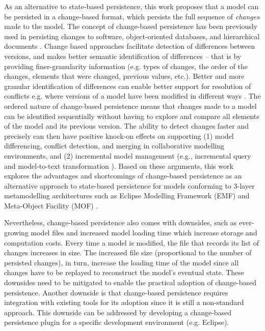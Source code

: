 As an alternative to state-based persistence, this work proposes that a model can be persisted in a change-based format, 
which persists the full sequence of \emph{changes} made to the model. 
The concept of change-based persistence has been previously used in persisting changes to software, 
object-oriented databases, and hierarchical documents 
\cite{DBLP:journals/entcs/RobbesL07,DBLP:conf/sde/LippeO92,DBLP:conf/caise/IgnatN05}. Change based approaches facilitate detection of differences between versions, and makes better semantic identification of differences -- that is by providing finer-granularity information (e.g. types of changes, the order of the changes, elements that were changed, previous values, etc.).  Better and more granular identification of differences can enable better support for resolution of conflicts e.g. where versions of a model have been modified in different ways \cite{mens2002state}. 
The ordered nature of change-based persistence means that changes made to a model can be identified sequentially without having to explore and compare all elements of the model and its previous version. The ability to detect changes faster and precisely can then have positive knock-on effects on supporting (1) model differencing, conflict detection, and merging in collaborative modelling environments, and (2) incremental model management (e.g., incremental query \cite{DBLP:conf/ecmdafa/RathHV12} and model-to-text transformation \cite{DBLP:conf/ecmdafa/OgunyomiRK15}). Based on these arguments, 
this work explores the advantages and shortcomings of change-based persistence as an alternative approach to state-based persistence for models conforming to 3-layer metamodelling architectures such as Eclipse Modelling Framework (EMF) \cite{eclipse2019emf} and Meta-Object Facility (MOF) \cite{omg2018mof}.

Nevertheless, change-based persistence also comes with downsides, such as ever-growing model files \cite{DBLP:journals/entcs/RobbesL07,DBLP:conf/edoc/KoegelHLHD10} and increased model loading time \cite{mens2002state}
which increase storage and computation costs. Every time a model is modified, the file that records its list of changes increases in size. The increased file size (proportional to the number of persisted changes),  in turn, increase the loading time of the model since all changes have to be replayed to reconstruct the model's eventual state. These downsides need to be mitigated to enable the practical adoption of change-based persistence. Another downside is that change-based persistence requires integration with existing tools for its adoption \cite{koegel2010emfstore} since it is still a non-standard approach. This downside can be addressed by developing a change-based persistence plugin for a specific development environment (e.g. Eclipse).

